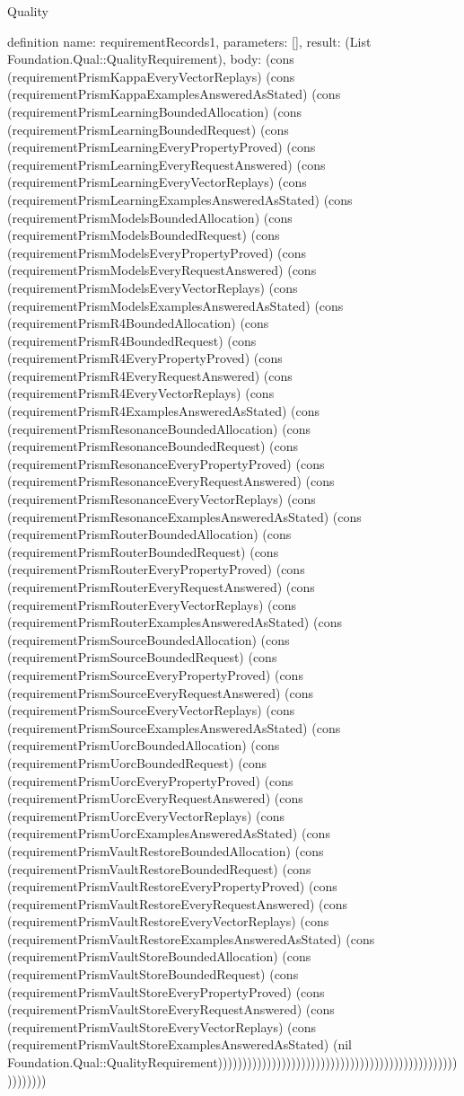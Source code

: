 \begin{lexlean}{Quality}
\begin{semanticmodule}
definition{
  name: requirementRecords1,
  parameters: [],
  result: (List Foundation.Qual::QualityRequirement),
  body: (cons (requirementPrismKappaEveryVectorReplays) (cons (requirementPrismKappaExamplesAnsweredAsStated) (cons (requirementPrismLearningBoundedAllocation) (cons (requirementPrismLearningBoundedRequest) (cons (requirementPrismLearningEveryPropertyProved) (cons (requirementPrismLearningEveryRequestAnswered) (cons (requirementPrismLearningEveryVectorReplays) (cons (requirementPrismLearningExamplesAnsweredAsStated) (cons (requirementPrismModelsBoundedAllocation) (cons (requirementPrismModelsBoundedRequest) (cons (requirementPrismModelsEveryPropertyProved) (cons (requirementPrismModelsEveryRequestAnswered) (cons (requirementPrismModelsEveryVectorReplays) (cons (requirementPrismModelsExamplesAnsweredAsStated) (cons (requirementPrismR4BoundedAllocation) (cons (requirementPrismR4BoundedRequest) (cons (requirementPrismR4EveryPropertyProved) (cons (requirementPrismR4EveryRequestAnswered) (cons (requirementPrismR4EveryVectorReplays) (cons (requirementPrismR4ExamplesAnsweredAsStated) (cons (requirementPrismResonanceBoundedAllocation) (cons (requirementPrismResonanceBoundedRequest) (cons (requirementPrismResonanceEveryPropertyProved) (cons (requirementPrismResonanceEveryRequestAnswered) (cons (requirementPrismResonanceEveryVectorReplays) (cons (requirementPrismResonanceExamplesAnsweredAsStated) (cons (requirementPrismRouterBoundedAllocation) (cons (requirementPrismRouterBoundedRequest) (cons (requirementPrismRouterEveryPropertyProved) (cons (requirementPrismRouterEveryRequestAnswered) (cons (requirementPrismRouterEveryVectorReplays) (cons (requirementPrismRouterExamplesAnsweredAsStated) (cons (requirementPrismSourceBoundedAllocation) (cons (requirementPrismSourceBoundedRequest) (cons (requirementPrismSourceEveryPropertyProved) (cons (requirementPrismSourceEveryRequestAnswered) (cons (requirementPrismSourceEveryVectorReplays) (cons (requirementPrismSourceExamplesAnsweredAsStated) (cons (requirementPrismUorcBoundedAllocation) (cons (requirementPrismUorcBoundedRequest) (cons (requirementPrismUorcEveryPropertyProved) (cons (requirementPrismUorcEveryRequestAnswered) (cons (requirementPrismUorcEveryVectorReplays) (cons (requirementPrismUorcExamplesAnsweredAsStated) (cons (requirementPrismVaultRestoreBoundedAllocation) (cons (requirementPrismVaultRestoreBoundedRequest) (cons (requirementPrismVaultRestoreEveryPropertyProved) (cons (requirementPrismVaultRestoreEveryRequestAnswered) (cons (requirementPrismVaultRestoreEveryVectorReplays) (cons (requirementPrismVaultRestoreExamplesAnsweredAsStated) (cons (requirementPrismVaultStoreBoundedAllocation) (cons (requirementPrismVaultStoreBoundedRequest) (cons (requirementPrismVaultStoreEveryPropertyProved) (cons (requirementPrismVaultStoreEveryRequestAnswered) (cons (requirementPrismVaultStoreEveryVectorReplays) (cons (requirementPrismVaultStoreExamplesAnsweredAsStated) (nil Foundation.Qual::QualityRequirement)))))))))))))))))))))))))))))))))))))))))))))))))))))))))
}


\end{semanticmodule}
\end{lexlean}
